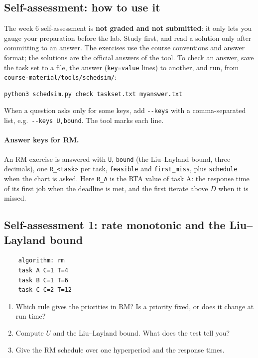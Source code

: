 \subsection*{Self-assessment: how to use it}
The week 6 self-assessment is \textbf{not graded and not submitted}: it only lets you gauge your preparation before the lab. Study first, and read a solution only after committing to an answer. The exercises use the course conventions and answer format; the solutions are the official answers of the tool. To check an answer, save the task set to a file, the answer (\texttt{key=value} lines) to another, and run, from \texttt{course-material/tools/schedsim/}:
\begin{lstlisting}[language=bash]
    python3 schedsim.py check taskset.txt myanswer.txt
\end{lstlisting}
When a question asks only for some keys, add \texttt{-{}-keys} with a comma-separated list, e.g.\ \texttt{-{}-keys U,bound}. The tool marks each line.

\paragraph*{Answer keys for RM.} An RM exercise is answered with \texttt{U}, \texttt{bound} (the Liu--Layland bound, three decimals), one \texttt{R\_<task>} per task, \texttt{feasible} and \texttt{first\_miss}, plus \texttt{schedule} when the chart is asked. Here \texttt{R\_A} is the RTA value of task A: the response time of its first job when the deadline is met, and the first iterate above $D$ when it is missed.

\subsection*{Self-assessment 1: rate monotonic and the Liu--Layland bound}
\begin{lstlisting}
    algorithm: rm
    task A C=1 T=4
    task B C=1 T=6
    task C C=2 T=12
\end{lstlisting}
\begin{enumerate}
    \item Which rule gives the priorities in RM? Is a priority fixed, or does it change at run time?
    \item Compute $U$ and the Liu--Layland bound. What does the test tell you?
    \item Give the RM schedule over one hyperperiod and the response times.
\end{enumerate}

